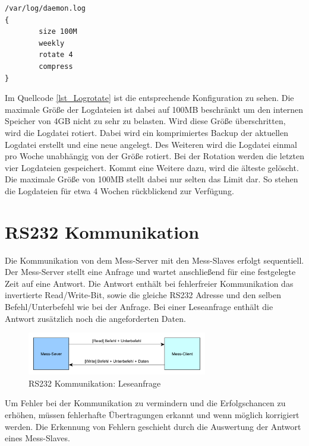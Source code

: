 \begin{lstlisting}[caption={Logrotate},label=lst_Logrotate]
/var/log/daemon.log
{
        size 100M
        weekly
        rotate 4
        compress
}
\end{lstlisting}

Im Quellcode \ref{lst_Logrotate} ist die entsprechende Konfiguration zu sehen. Die maximale Größe der Logdateien ist dabei auf 100MB beschränkt um den internen Speicher von 4GB nicht zu sehr zu belasten. Wird diese Größe überschritten, wird die Logdatei rotiert. Dabei wird ein komprimiertes Backup der aktuellen Logdatei erstellt und eine neue angelegt. Des Weiteren wird die Logdatei einmal pro Woche unabhängig von der Größe rotiert. Bei der Rotation werden die letzten vier Logdateien gespeichert. Kommt eine Weitere dazu, wird die älteste gelöscht. Die maximale Größe von 100MB stellt dabei nur selten das Limit dar. So stehen die Logdateien für etwa 4 Wochen rückblickend zur Verfügung.



\section{RS232 Kommunikation}

Die Kommunikation von dem Mess-Server mit den Mess-Slaves erfolgt sequentiell. Der Mess-Server stellt eine Anfrage und wartet anschließend für eine festgelegte Zeit auf eine Antwort. Die Antwort enthält bei fehlerfreier Kommunikation das invertierte Read/Write-Bit, sowie die gleiche RS232 Adresse und den selben Befehl/Unterbefehl wie bei der Anfrage. Bei einer Leseanfrage enthält die Antwort zusätzlich noch die angeforderten Daten.\\

\begin{figure}[H]
\begin{center}
\includegraphics[width=0.7\textwidth ]{img/general/RS232Uebertragung.pdf}
\caption{RS232 Kommunikation: Leseanfrage}
\label{figure_RS232Kommunikation}
\end{center}
\end{figure}

Um Fehler bei der Kommunikation zu vermindern und die Erfolgschancen zu erhöhen, müssen fehlerhafte Übertragungen erkannt und wenn möglich korrigiert werden. Die Erkennung von Fehlern geschieht durch die Auswertung der Antwort eines Mess-Slaves.

